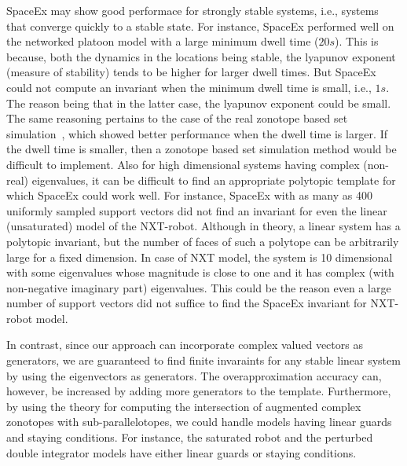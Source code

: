 SpaceEx may show good performace for strongly stable systems, i.e.,
systems that converge quickly to a stable state.  For instance,
SpaceEx performed well on the networked platoon model with a large
minimum dwell time ($20s$).  This is because, both the dynamics in the
locations being stable, the lyapunov exponent (measure of stability)
tends to be higher for larger dwell times.  But SpaceEx could not
compute an invariant when the minimum dwell time is small, i.e., $1s$.
The reason being that in the latter case, the lyapunov exponent could
be small.  The same reasoning pertains to the case of the real
zonotope based set simulation~\cite{makhlouf2014networked}, which
showed better performance when the dwell time is larger.  If the dwell
time is smaller, then a zonotope based set simulation method would be
difficult to implement.  Also for high dimensional systems having
complex (non-real) eigenvalues, it can be difficult to find an
appropriate polytopic template for which SpaceEx could work well.  For
instance, SpaceEx with as many as 400 uniformly sampled support
vectors did not find an invariant for even the linear (unsaturated)
model of the NXT-robot.  Although in theory, a linear system has a
polytopic invariant, but the number of faces of such a polytope can be
arbitrarily large for a fixed dimension.  In case of NXT model, the
system is 10 dimensional with some eigenvalues whose magnitude is
close to one and it has complex (with non-negative imaginary part)
eigenvalues.  This could be the reason even a large number of support
vectors did not suffice to find the SpaceEx invariant for NXT-robot
model.


In contrast, since our approach can incorporate complex valued vectors
as generators, we are guaranteed to find finite invaraints for any
stable linear system by using the eigenvectors as generators.  The
overapproximation accuracy can, however, be increased by adding more
generators to the template.  Furthermore, by using the theory for
computing the intersection of augmented complex zonotopes with
sub-parallelotopes, we could handle models having linear guards and
staying conditions.  For instance, the saturated robot and the
perturbed double integrator models  have either linear guards or
staying conditions.





